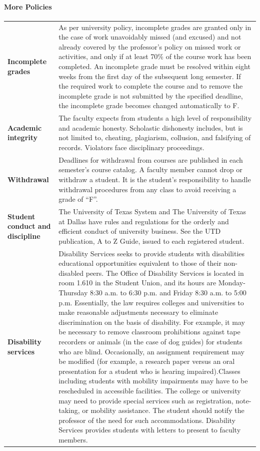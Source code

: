 \documentclass[10pt]{article}
\begin{document}
\paragraph{More  Policies}
\begin{center}
\begin{tabular}{|p{} p{}|}
\hline
\textbf{Incomplete grades} & As per university policy, incomplete grades are granted only in the case of work unavoidably missed (and excused) and not already covered by the professor's policy on missed work or activities, and only if at least 70\% of the course work has been completed. An incomplete grade must be resolved within eight weeks from the first day of the subsequent long semester. If the required work to complete the course and to remove the incomplete grade is not submitted by the specified deadline, the incomplete grade becomes changed automatically to F. \\
[.8ex]\textbf{Academic integrity} & The faculty expects from students a high level of responsibility and academic honesty. Scholastic dishonesty includes, but is not limited to, cheating, plagiarism, collusion, and falsifying of records. Violators face disciplinary proceedings.\\
[.8ex]\textbf{Withdrawal} & Deadlines for withdrawal from courses are published in each semester's course catalog. A faculty member cannot drop or withdraw a student. It is the student's responsibility to handle withdrawal procedures from any class to avoid receiving a grade of ``F''. \\
[.8ex]\textbf{Student conduct and discipline} & The University of Texas System and The University of Texas at Dallas have rules and regulations for the orderly and efficient conduct of university business.  See the UTD publication, A to Z Guide, issued to each registered student.\\
[.8ex]\textbf{Disability services} & Disability Services seeks to provide students with disabilities educational opportunities equivalent to those of their non-disabled peers. The Office of Disability Services is located in room 1.610 in the Student Union, and its hours are Monday-Thursday 8:30 a.m. to 6:30 p.m. and Friday 8:30 a.m. to 5:00 p.m. Essentially, the law requires colleges and universities to make reasonable adjustments necessary to eliminate discrimination on the basis of disability. For example, it may be necessary to remove classroom prohibitions against tape recorders or animals (in the case of dog guides) for students who are blind. Occasionally, an assignment requirement may be modified (for example, a research paper versus an oral presentation for a student who is hearing impaired).Classes including students with mobility impairments may have to be rescheduled in accessible facilities. The college or university may need to provide special services such as registration, note-taking, or mobility assistance. The student should notify the professor of the need for such accommodations. Disability Services provides students with letters to present to faculty members.\\

\end{tabular}
\end{center}
\end{document}
